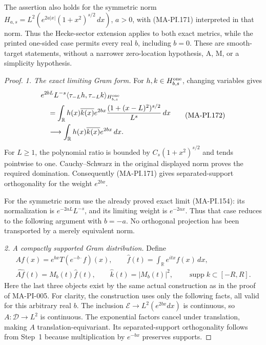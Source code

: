 The assertion also holds for the symmetric norm
\(H_{a,s}=L^2(e^{2a|x|}(1+x^2)^{s/2}\,dx)\), \(a>0\),
with (MA-PI.171) interpreted in that norm.
Thus the Hecke-sector extension applies to both exact
metrics, while the printed one-sided case permits every
real \(b\), including \(b=0\).
These are smooth-target statements, without a narrower
zero-location hypothesis, A, M, or a simplicity hypothesis.

\begin{proof}
\emph{1. The exact limiting Gram form.}
For \(h,k\in H^{\rm one}_{b,s}\), changing variables gives
\[
 \begin{split}
 &e^{2bL}L^{-s}
       \langle\tau_{-L}h,\tau_{-L}k\rangle_{H^{\rm one}_{b,s}}\\
 &\quad=\int_{\mathbb R}h(x)\overline{k(x)}e^{2bx}
       \frac{(1+(x-L)^2)^{s/2}}{L^s}\,dx\\
 &\quad\longrightarrow
       \int_{\mathbb R}h(x)\overline{k(x)}e^{2bx}\,dx .
 \end{split}
 \tag{MA-PI.172}
\]
For \(L\ge1\), the polynomial ratio is bounded by
\(C_s(1+x^2)^{s/2}\) and tends pointwise to one.
Cauchy--Schwarz in the original displayed norm proves
the required domination.  Consequently (MA-PI.171)
gives separated-support orthogonality for the weight
\(e^{2bx}\).

For the symmetric norm use the already proved exact
limit (MA-PI.154): its normalization is
\(e^{-2aL}L^{-s}\), and its limiting weight is \(e^{-2ax}\).
Thus that case reduces to the following argument with
\(b=-a\).  No orthogonal projection has been transported
by a merely equivalent norm.

\emph{2. A compactly supported Gram distribution.}
Define
\[
 \begin{gathered}
   Af(x)=e^{bx}T(e^{-b\cdot}f)(x),\qquad
   \widehat f(t)=\int_{\mathbb R}e^{itx}f(x)\,dx,\\
   \widehat{Af}(t)=M_b(t)\widehat f(t),\qquad
   \widehat k(t)=|M_b(t)|^2,\qquad
   \operatorname{supp}k\subset[-R,R].
 \end{gathered}
 \tag{MA-PI.173}
\]
Here the last three objects exist by the same actual
construction as in the proof of MA-PI-005.
For clarity, the construction uses only the following
facts, all valid for this arbitrary real \(b\).
The inclusion \(\mathcal E\to L^2(e^{2bx}dx)\) is continuous,
so \(A:\mathcal D\to L^2\) is continuous.
The exponential factors cancel under translation, making
\(A\) translation-equivariant.  Its separated-support
orthogonality follows from Step~1 because multiplication
by \(e^{-bx}\) preserves supports.


\end{proof}
